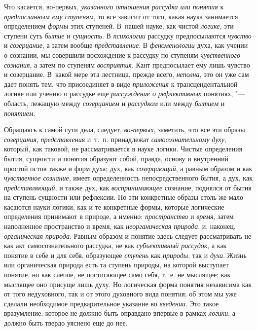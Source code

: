{Что касается, во-первых,
{\em указанного отношения рассудка или
понятия} к
{\em предпосланным ему ступеням},
то все зависит от того, какая наука занимается определением
{\em формы} этих
ступеней. В~нашей науке, как чистой
{\em логике}, эти ступени
суть {\em бытие} и
{\em сущность}. В
{\em психологии} рассудку
предпосылаются {\em чувство}
и {\em созерцание},
а затем вообще
{\em представление}. В
{\em феноменологии} духа,
как учении о сознании, мы совершили восхождение к рассудку
по ступеням {\em чувственного
сознания}, а затем по ступеням
{\em восприятия}. Кант
предпосылает ему лишь чувство и созерцание. В~какой мере эта лестница,
прежде всего, {\em неполна},
это он уже сам дает понять тем, что присоединяет в виде
{\em приложения} к
трансцендентальной логике или учению о рассудке еще
{\em рассуждение о рефлективных}
понятиях, "--- область, лежащую между
{\em созерцанием} и
{\em рассудком} или между
{\em бытием} и
{\em понятием}.

Обращаясь к самой сути дела, следует,
{\em во-первых},
заметить, что все эти образы
{\em созерцания},
{\em представления}
и~т.~п. принадлежат
{\em самосознательному духу},
который, как таковой, не рассматривается в науке логики.
Чистые определения бытия, сущности и понятия образуют собой, правда, основу
и внутренний простой остов также и форм духа; дух, как
{\em созерцающий}, а
равным образом и как {\em чувственное
сознание}, имеет определенность непосредственного бытия, а
дух, как {\em представляющий},
и также дух, как
{\em воспринимающее}
сознание, поднялся от бытия на ступень сущности или
рефлексии. Но эти конкретные образы столь же мало касаются науки логики,
как и те конкретные формы, которые логические определения принимают в
природе, а именно: {\em пространство}
и {\em время},
затем наполненное пространство и время, как
{\em неорганическая природа},
и, наконец,
{\em органическая природа}.
Равным образом и понятие здесь следует рассматривать не как
акт самосознательного рассудка, не как
{\em субъективный рассудок},
а как понятие в себе и для себя, образующее
{\em ступень} как
{\em природы}, так и
{\em духа}. Жизнь или
органическая природа есть та ступень природы, на которой выступает понятие,
но как слепое, не постигающее само себя, т.~е. не мыслящее; как мыслящее
оно присуще лишь духу. Но логическая форма понятия независима как от того
недуховного, так и от этого духовного вида понятия; об этом мы уже сделали
необходимое предварительное указание во
{\em введении}. Это такое
вразумление, которое не должно быть оправдано впервые в рамках
{\em логики}, а должно
быть твердо уяснено еще до нее.

}
